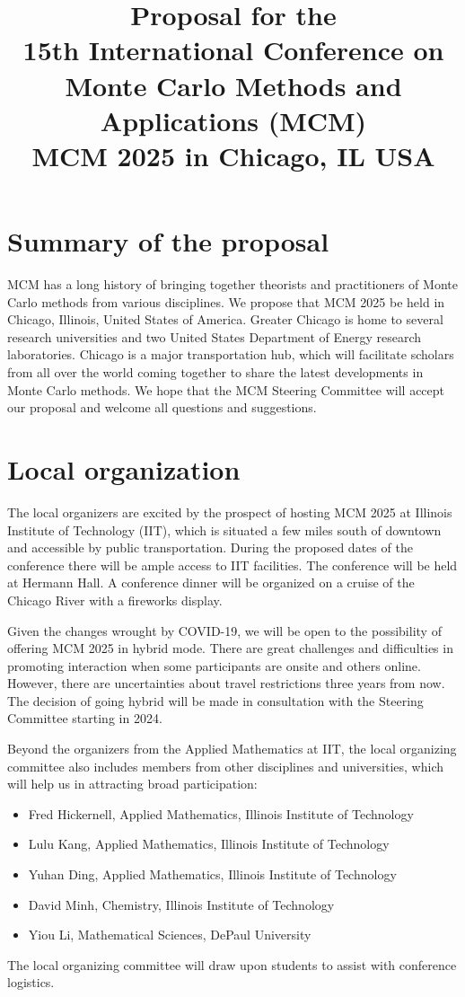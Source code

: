 \documentclass{article}
\title{Proposal for the \\
15th International Conference on Monte Carlo Methods and Applications (MCM)\\
MCM 2025 in Chicago, IL USA}
\begin{document}
\maketitle

\section{Summary of the proposal}
MCM has a long history of bringing together theorists and practitioners of Monte Carlo methods from various disciplines.  We propose that MCM 2025 be held in Chicago, Illinois, United States of America.  Greater Chicago is home to several research universities and two United States Department of Energy research laboratories.  Chicago is a major transportation hub, which will facilitate scholars from all over the world coming together to share the latest developments in Monte Carlo methods. We hope that the MCM Steering Committee will accept our proposal and welcome all questions and suggestions.

\section{Local organization}
The local organizers are excited by the prospect of hosting MCM 2025 at Illinois Institute of Technology (IIT), which is situated a few miles south of downtown and accessible by public transportation. During the proposed dates of the conference there will be ample access to IIT facilities.  The conference will be held at Hermann Hall. A conference dinner will be organized on a cruise of the Chicago River with a fireworks display. 

Given the changes wrought by COVID-19, we will be open to the possibility of offering MCM 2025 in hybrid mode.  There are great challenges and difficulties in promoting interaction when some participants are onsite and others online.  However, there are uncertainties about travel restrictions three years from now.  The decision of going hybrid will be made in consultation with the Steering Committee starting in 2024.

Beyond the organizers from the Applied Mathematics at IIT, the local organizing committee also includes members from other disciplines and universities, which will help us in attracting broad participation:
\begin{itemize}
    \item  Fred Hickernell, Applied Mathematics, Illinois Institute of Technology
    \item  Lulu Kang, Applied Mathematics, Illinois Institute of Technology
    \item  Yuhan Ding, Applied Mathematics, Illinois Institute of Technology
    \item  David Minh, Chemistry, Illinois Institute of Technology
    \item  Yiou Li, Mathematical Sciences, DePaul University
\end{itemize}
The local organizing committee will draw upon students to assist with conference logistics.
\end{document}

